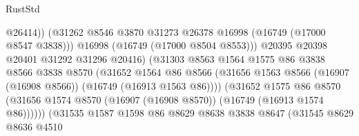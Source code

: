 \begin{lexlean}{RustStd}
\begin{coremodule}
                                            @26414))
                                        (@31262
                                          @8546
                                          @3870
                                          @31273
                                          @26378
                                          @16998
                                          (@16749 (@17000 @8547 @3838)))
                                        @16998
                                        (@16749 (@17000 @8504 @8553)))
                                      @20395
                                      @20398
                                      @20401
                                      @31292
                                      @31296
                                      @20416)
                                    (@31303
                                      @8563
                                      @1564
                                      @1575
                                      @86
                                      @3838
                                      @8566
                                      @3838
                                      @8570
                                      (@31652
                                        @1564
                                        @86
                                        @8566
                                        (@31656
                                          @1563
                                          @8566
                                          (@16907 (@16908 @8566))
                                          (@16749 (@16913 @1563 @86))))
                                      (@31652
                                        @1575
                                        @86
                                        @8570
                                        (@31656
                                          @1574
                                          @8570
                                          (@16907 (@16908 @8570))
                                          (@16749 (@16913 @1574 @86))))))
                                  (@31535
                                    @1587
                                    @1598
                                    @86
                                    @8629
                                    @8638
                                    @3838
                                    @8647
                                    (@31545
                                      @8629
                                      @8636
                                      @4510

\end{coremodule}
\end{lexlean}
